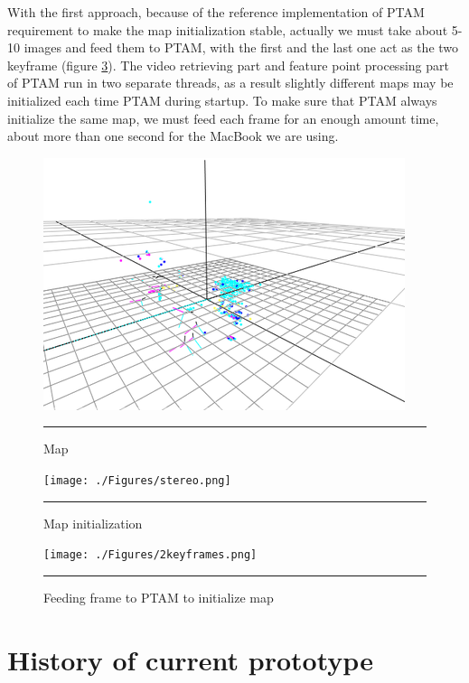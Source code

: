 With the first approach, because of the reference implementation of PTAM requirement to make the map initialization stable, actually we must take about 5-10 images and feed them to PTAM, with the first and the last one act as the two keyframe (figure \ref{fig:2KeyFrames}). The video retrieving part and feature point processing part of PTAM run in two separate threads, as a result slightly different maps may be initialized each time PTAM during startup. To make sure that PTAM always initialize the same map, we must feed each frame for an enough amount time, about more than one second for the MacBook we are using.

\begin{figure}[htbp]
	\centering
	\includegraphics{./Primitives/map.png}
	\rule{35em}{0.5pt}
	\caption[Map]{Map}
	\label{fig:Map}
\end{figure}

\begin{figure}[htbp]
	\centering
	\texttt{[image: ./Figures/stereo.png]}
	\rule{35em}{0.5pt}
	\caption[Map initialization]{Map initialization}
	\label{fig:Stereo}
\end{figure}

\begin{figure}[htbp]
	\centering
	\texttt{[image: ./Figures/2keyframes.png]}
	\rule{35em}{0.5pt}
	\caption[Feeding frame to PTAM to initialize map]{Feeding frame to PTAM to initialize map}
	\label{fig:2KeyFrames}
\end{figure}


\section{History of current prototype}

